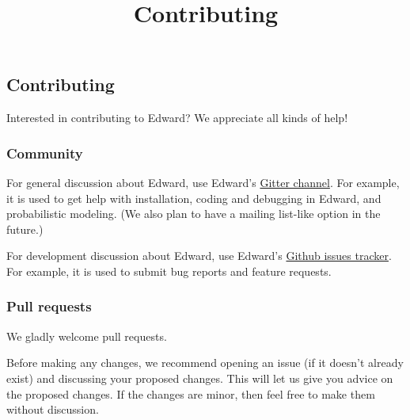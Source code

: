 \title{Contributing}

\subsection{Contributing}

Interested in contributing to Edward? We appreciate all kinds of help!

\subsubsection{Community}

For general discussion about Edward, use Edward's
\href{http://gitter.im/blei-lab/edward}{Gitter channel}.
For example, it is used to get help with installation, coding and
debugging in Edward, and probabilistic modeling.
(We also plan to have a mailing list-like option in the future.)

For development discussion about Edward, use Edward's
\href{https://github.com/blei-lab/edward/issues}{Github issues tracker}.
For example, it is used to submit bug reports and feature requests.

\subsubsection{Pull requests}

We gladly welcome pull requests.

Before making any changes, we recommend opening an issue (if it
doesn't already exist) and discussing your proposed changes. This will
let us give you advice on the proposed changes. If the changes are
minor, then feel free to make them without discussion.

